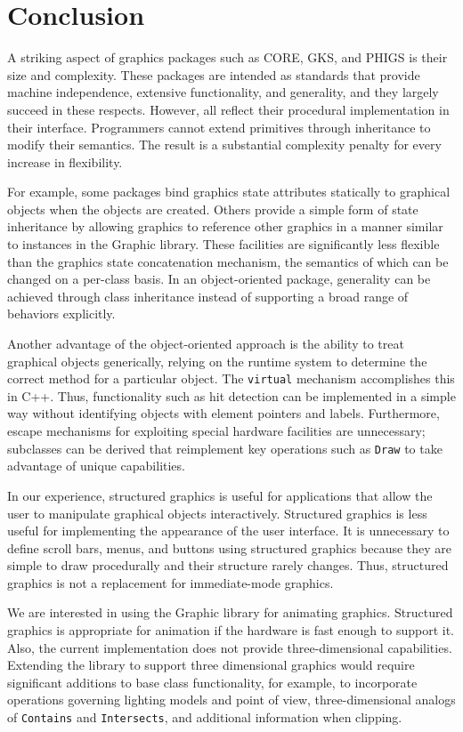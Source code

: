 \section{Conclusion}

A striking aspect of graphics packages such as CORE, GKS, and
PHIGS is their size and complexity.  These packages are intended as
standards that provide machine independence, extensive functionality, and
generality, and they largely succeed in these respects.  However, all
reflect their procedural implementation in their interface.  Programmers
cannot extend primitives through inheritance to modify their semantics.  The
result is a substantial complexity penalty for every increase in
flexibility.

For example, some packages bind 
graphics state attributes statically to graphical objects when the objects are
created.  Others provide a simple form of state inheritance by allowing
graphics to reference other graphics in a manner
similar to instances in the Graphic library.  These facilities are
significantly less flexible than the graphics state concatenation mechanism,
the semantics of which
can be changed on a per-class basis.  In an object-oriented
package, generality can be achieved through class inheritance
instead of supporting a broad range of behaviors explicitly.

Another advantage of the object-oriented approach is the ability to treat
graphical objects generically, relying on the runtime system to determine
the correct method for a particular object.  The {\tt virtual} mechanism
accomplishes this in C++.  Thus, functionality such as hit detection can be
implemented in a simple way without identifying objects with
element pointers and labels.  Furthermore, escape mechanisms for exploiting
special hardware facilities are unnecessary;  subclasses can be derived
that reimplement key operations such as {\tt Draw} to take advantage of
unique capabilities.

In our experience, structured graphics is useful for applications
that allow the user to manipulate graphical objects interactively.
Structured graphics is less useful for implementing the appearance of the
user interface.  It is unnecessary to define scroll bars, menus, and
buttons using structured graphics because they are simple to draw
procedurally and their structure rarely changes.  Thus, structured graphics
is not a replacement for immediate-mode graphics.

We are interested in using the Graphic library for animating graphics.
Structured graphics is appropriate for animation if the hardware is fast
enough to support it.  Also, the current implementation does not provide
three-dimensional capabilities.  Extending the library to support three
dimensional graphics would require significant additions to base class
functionality, for example, to incorporate operations governing lighting
models and point of view, three-dimensional analogs of {\tt Contains} and
{\tt Intersects}, and additional information when clipping.

